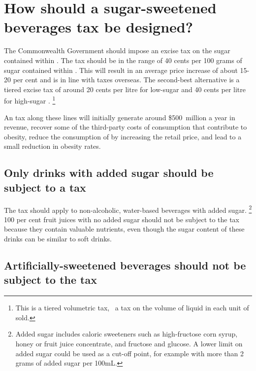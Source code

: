 \documentclass[embargoed]{grattan}
\begin{document}
\chapter{How should a sugar-sweetened beverages tax be designed?}\label{how-should-a-sugar-sweetened-beverages-tax-be-designed}

The Commonwealth Government should impose an excise tax on the sugar contained within \SSBs{}.
The tax should be in the range of 40 cents per 100 grams of sugar contained within \SSBs{}.
This will result in an average price increase of about 15-20 per cent and is in line with \SSB{} taxes overseas.
The second-best alternative is a tiered excise tax of around 20 cents per litre for low-sugar \SSBs{} and 40 cents per litre for high-sugar \SSBs{}.%
\footnote{This is a tiered volumetric tax, \ie~a tax on the volume of liquid in each unit of \SSB{} sold.}

An \SSB{} tax along these lines will initially generate around \$500~million a year in revenue, recover some of the third-party costs of consumption that contribute to obesity, reduce the consumption of \SSBs{} by increasing the retail price, and lead to a small reduction in obesity rates.

\section{Only drinks with added sugar should be subject to a tax}\label{only-drinks-with-added-sugar-should-be-subject-to-a-tax}

The \SSB{} tax should apply to non-alcoholic, water-based beverages with added sugar.%
\footnote{Added sugar includes caloric sweeteners such as high-fructose corn syrup, honey or fruit juice concentrate, and fructose and glucose.
A lower limit on added sugar could be used as a cut-off point, for example \SSBs{} with more than 2 grams of added sugar per 100mL.} 100 per cent fruit juices with no added sugar should not be subject to the tax because they contain valuable nutrients, even though the sugar content of these drinks can be similar to soft drinks.

\section{Artificially-sweetened beverages should not be subject to the \SSB{} tax}\label{artificially-sweetened-beverages-should-not-be-subject-to-the-ssb-tax}
\end{document}
